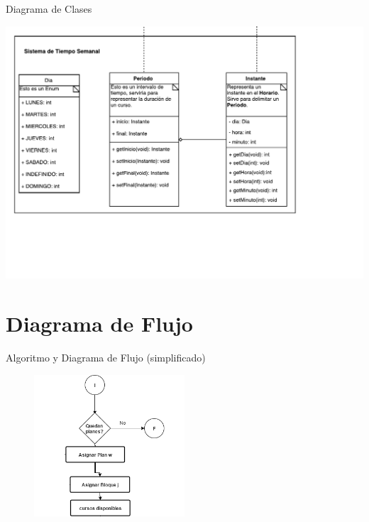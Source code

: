\documentclass[10pt]{beamer}
\begin{document}
\begin{frame}{Diagrama de Clases}
\begin{center}
    \includegraphics[width=\textwidth]{diagramaClases3}
\end{center}
\end{frame}






\section{Diagrama de Flujo }
\begin{frame}{Algoritmo y Diagrama de Flujo (simplificado)}{}
\begin{block}{}


\begin{figure}[!h]
\centering
\includegraphics[width=0.50\textwidth]{./AAUgraphics/flux1.png}
\end{figure}

\end{block}
\end{frame}
\end{document}
